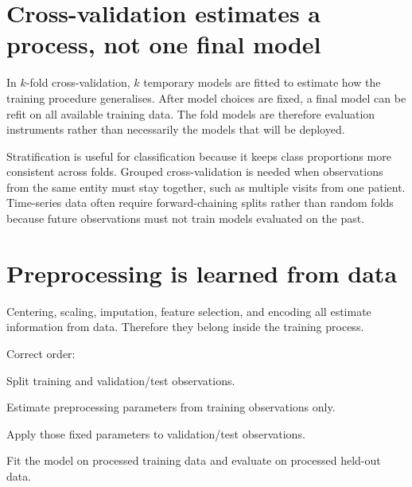 \section{Cross-validation estimates a process, not one final model}
In $k$-fold cross-validation, $k$ temporary models are fitted to estimate how the training procedure generalises. After model choices are fixed, a final model can be refit on all available training data. The fold models are therefore evaluation instruments rather than necessarily the models that will be deployed.

Stratification is useful for classification because it keeps class proportions more consistent across folds. Grouped cross-validation is needed when observations from the same entity must stay together, such as multiple visits from one patient. Time-series data often require forward-chaining splits rather than random folds because future observations must not train models evaluated on the past.


\section{Preprocessing is learned from data}
Centering, scaling, imputation, feature selection, and encoding all estimate information from data. Therefore they belong inside the training process.

Correct order:
\begin{utpsteps}
  \item Split training and validation/test observations.
  \item Estimate preprocessing parameters from training observations only.
  \item Apply those fixed parameters to validation/test observations.
  \item Fit the model on processed training data and evaluate on processed held-out data.
\end{utpsteps}


